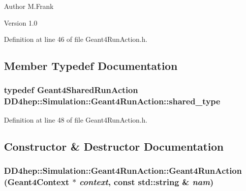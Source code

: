 \begin{DoxyAuthor}{Author}
M.Frank 
\end{DoxyAuthor}
\begin{DoxyVersion}{Version}
1.0 
\end{DoxyVersion}


Definition at line 46 of file Geant4RunAction.h.

\subsection{Member Typedef Documentation}
\hypertarget{class_d_d4hep_1_1_simulation_1_1_geant4_run_action_a188fa9477fc65c6c825bf55abd0088e3}{
\subsubsection[{shared\_\-type}]{\setlength{\rightskip}{0pt plus 5cm}typedef {\bf Geant4SharedRunAction} {\bf DD4hep::Simulation::Geant4RunAction::shared\_\-type}}}
\label{class_d_d4hep_1_1_simulation_1_1_geant4_run_action_a188fa9477fc65c6c825bf55abd0088e3}


Definition at line 48 of file Geant4RunAction.h.

\subsection{Constructor \& Destructor Documentation}
\hypertarget{class_d_d4hep_1_1_simulation_1_1_geant4_run_action_acba7cd27cdc34c98d799848c4bc5ccf6}{
\subsubsection[{Geant4RunAction}]{\setlength{\rightskip}{0pt plus 5cm}DD4hep::Simulation::Geant4RunAction::Geant4RunAction ({\bf Geant4Context} $\ast$ {\em context}, \/  const std::string \& {\em nam})}}
\label{class_d_d4hep_1_1_simulation_1_1_geant4_run_action_acba7cd27cdc34c98d799848c4bc5ccf6}


